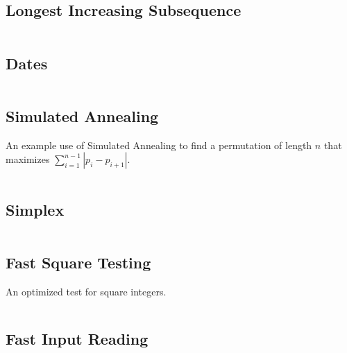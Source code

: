 \documentclass[8pt,a4paper,landscape,oneside]{amsart}
\newcommand{\code}[1]{\inputminted[fontsize=\normalsize,baselinestretch=1]{cpp}{_code/#1}}
\newif\ifverbose
\begin{document}
\begin{multicols*}{3}
    \subsection{Longest Increasing Subsequence}
        \code{other/lis.cpp}

    \subsection{Dates}
        \ifverbose
        Functions to simplify date calculations.
        \fi
        \code{other/dates.cpp}

    \subsection{Simulated Annealing}
        An example use of Simulated Annealing to find a permutation of length $n$
        that maximizes $\sum_{i=1}^{n-1}|p_i - p_{i+1}|$.
        \code{other/simulated_annealing.cpp}

    \subsection{Simplex}
        \code{other/simplex.cpp}

    \subsection{Fast Square Testing}
        An optimized test for square integers.
        \code{tricks/is_square.cpp}

    \subsection{Fast Input Reading}
        \ifverbose
        If input or output is huge, sometimes it is beneficial to optimize the
        input reading/output writing. This can be achieved by reading all input
        in at once (using fread), and then parsing it manually. Output can also
        be stored in an output buffer and then dumped once in the end (using
        fwrite). A simpler, but still effective, way to achieve speed is to use
        the following input reading method.
        \fi
        \code{tricks/fast_input.cpp}

    \ifverbose
    \subsection{128-bit Integer}
        GCC has a 128-bit integer data type named \texttt{\_\_int128}. Useful
        if doing multiplication of 64-bit integers, or something needing a
        little more than 64-bits to represent. There's also
        \texttt{\_\_float128}.
    \fi


\end{multicols*}
\end{document}
